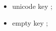 \begin{itemize}
	\item unicode key \cite{dieudonné1969treatise};
	\item empty key \cite{};
\end{itemize}